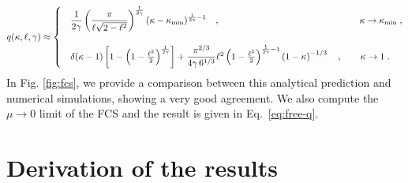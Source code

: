 \documentclass[onecolumn,superscriptaddress,
 amsmath,amssymb,
 aps,
 prd,
]{revtex4-1}
\begin{document}
{\begin{eqnarray}
q(\kappa, \ell, \gamma) \approx
\begin{cases}
& \dfrac{1}{2\gamma} \left( \dfrac{\pi}{\ell\sqrt{2 - \ell^2}} \right)^{\frac{1}{2\gamma}} (\kappa-\kappa_{\min})^{\frac{1}{2\gamma} - 1} \quad, \quad\quad\quad  \hspace*{4.3cm}\kappa \to \kappa_{\rm min} \;,\\
& \\
& \delta(\kappa - 1) \left[1 - \left(1 - \frac{\ell^2}{2}\right)^{\frac{1}{2 \gamma}}\right] + \dfrac{\pi^{2/3}}{4 \gamma \, 6^{1/3}} \ell^2 \left(1 - \frac{\ell^2}{2}\right)^{\frac{1}{2 \gamma} - 1} \left({1 - \kappa}\right)^{-1/3} \quad, \quad \quad \kappa \to  1 \;. \\
\end{cases} 
\end{eqnarray}
%
In Fig. \ref{fig:fcs}, we provide a comparison between this analytical prediction and numerical simulations, showing a very good agreement. We also compute the $\mu \to 0$ limit of the FCS and the result is given in Eq.~\eqref{eq:free-q}.







\section{Derivation of the results} \label{sec:model}

}
\end{document}
